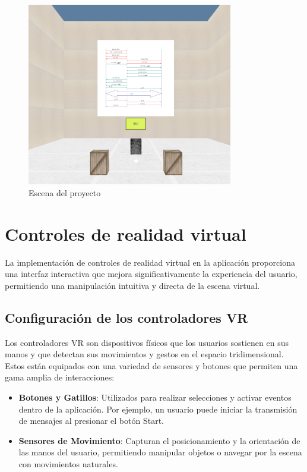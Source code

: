 \documentclass[a4paper, 12pt]{book}
\begin{document}
\begin{figure}
  \centering
  \includegraphics[width=9cm, keepaspectratio]{img/escena.png}
  \caption{Escena del proyecto}
  \label{fig:escena}
\end{figure}


\section{Controles de realidad virtual}
\label{sec:controles_vr}

La implementación de controles de realidad virtual en la aplicación proporciona una interfaz interactiva que mejora significativamente la experiencia del usuario, 
permitiendo una manipulación intuitiva y directa de la escena virtual.

\subsection{Configuración de los controladores VR}
\label{subsec:configuracion_controladores_vr}

Los controladores VR son dispositivos físicos que los usuarios sostienen en sus manos y que detectan sus movimientos y gestos en el espacio tridimensional. 
Estos están equipados con una variedad de sensores y botones que permiten una gama amplia de interacciones:

\begin{itemize}
  \item \textbf{Botones y Gatillos}: Utilizados para realizar selecciones y activar eventos dentro de la aplicación. 
  Por ejemplo, un usuario puede iniciar la transmisión de mensajes al presionar el botón Start.
  \item \textbf{Sensores de Movimiento}: Capturan el posicionamiento y la orientación de las manos del usuario, 
  permitiendo manipular objetos o navegar por la escena con movimientos naturales.
\end{itemize}
\end{document}
